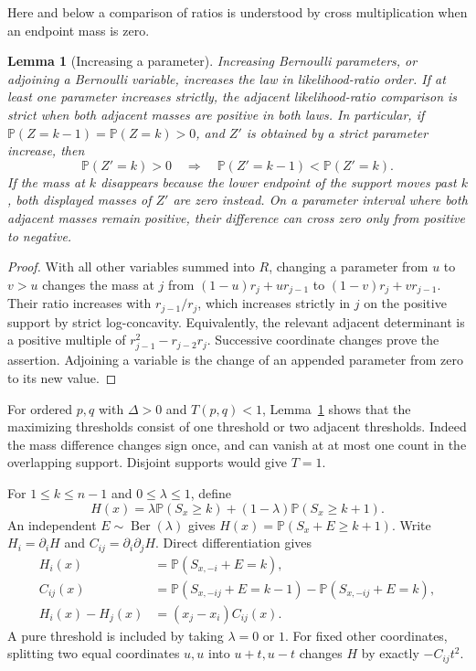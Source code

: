 \documentclass[11pt]{article}
\numberwithin{equation}{section}
\newtheorem{lemma}[theorem]{Lemma}
\theoremstyle{remark}\newtheorem{remark}[theorem]{Remark}
\DeclareMathOperator{\Ber}{Ber}
\newcommand{\PP}{\mathbb P}
\begin{document}
Here and below a comparison of ratios is understood by cross
multiplication when an endpoint mass is zero.
\begin{lemma}[Increasing a parameter]\label{lem:lr}
Increasing Bernoulli parameters, or adjoining a Bernoulli variable,
increases the law in likelihood-ratio order. If at least one parameter
increases strictly, the adjacent likelihood-ratio comparison is strict
when both adjacent masses are positive in both laws. In particular, if
$\PP(Z=k-1)=\PP(Z=k)>0$, and $Z'$ is obtained by a strict parameter
increase, then
\[
 \PP(Z'=k)>0\quad\Longrightarrow\quad
 \PP(Z'=k-1)<\PP(Z'=k).
\]
If the mass at $k$ disappears because the lower endpoint of the support
moves past $k$, both displayed masses of $Z'$ are zero instead.
On a parameter interval where both adjacent masses remain positive,
their difference can cross zero only from positive to negative.
\end{lemma}
\begin{proof}
With all other variables summed into $R$, changing a parameter from $u$
to $v>u$ changes the mass at $j$ from
$(1-u)r_j+ur_{j-1}$ to $(1-v)r_j+vr_{j-1}$. Their ratio increases with
$r_{j-1}/r_j$, which increases strictly in $j$ on the positive support by
strict log-concavity. Equivalently, the relevant adjacent determinant is
a positive multiple of $r_{j-1}^2-r_{j-2}r_j$.
Successive coordinate changes prove the assertion. Adjoining a variable
is the change of an appended parameter from zero to its new value.
\end{proof}

For ordered $p,q$ with $\Delta>0$ and $T(p,q)<1$, Lemma~\ref{lem:lr}
shows that the maximizing thresholds consist of one threshold or two
adjacent thresholds. Indeed the mass difference changes sign once, and
can vanish at at most one count in the overlapping support. Disjoint
supports would give $T=1$.

For $1\le k\le n-1$ and $0\le\lambda\le1$, define
\[
 H(x)=\lambda\PP(S_x\ge k)+(1-\lambda)\PP(S_x\ge k+1).
\]
An independent $E\sim\Ber(\lambda)$ gives
$H(x)=\PP(S_x+E\ge k+1)$. Write $H_i=\partial_i H$ and
$C_{ij}=\partial_i\partial_j H$. Direct differentiation gives
\begin{align}
 H_i(x)&=\PP(S_{x,-i}+E=k),\label{eq:gradient}\\
 C_{ij}(x)&=\PP(S_{x,-ij}+E=k-1)-\PP(S_{x,-ij}+E=k),\label{eq:coefficient}\\
 H_i(x)-H_j(x)&=(x_j-x_i)C_{ij}(x).\label{eq:grad-difference}
\end{align}
A pure threshold is included by taking $\lambda=0$ or $1$.
For fixed other coordinates, splitting two equal coordinates $u,u$ into
$u+t,u-t$ changes $H$ by exactly $-C_{ij}t^2$.
\end{document}
